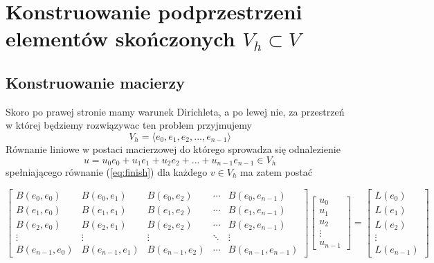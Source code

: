 \documentclass[12pt]{article}
\begin{document}
\section{Konstruowanie podprzestrzeni elementów skończonych $V_h \subset V$}
\subsection{Konstruowanie macierzy}
Skoro po prawej stronie mamy warunek Dirichleta, a po lewej nie, za przestrzeń w której będziemy rozwiązywac ten problem przyjmujemy
\begin{equation}
    V_h = \langle e_0, e_1, e_2, ..., e_{n-1}\rangle
\end{equation}
% 
Równanie liniowe w postaci macierzowej do którego sprowadza się odnalezienie
\begin{equation}
    u = u_0e_0 + u_1e_1 + u_2e_2 + ... + u_{n-1}e_{n-1} \in V_h
\end{equation}
% 
spełniającego równanie (\ref{eq:finish}) dla każdego $v \in V_h$ ma zatem postać

\begin{equation}
    \begin{bmatrix}
        B(e_0,e_0) & B(e_0,e_1) & B(e_0,e_2) & \cdots & B(e_0,e_{n-1}) \\
        B(e_1,e_0) & B(e_1,e_1) & B(e_1,e_2) & \cdots & B(e_1,e_{n-1}) \\
        B(e_2,e_0) & B(e_2,e_1) & B(e_2,e_2) & \cdots & B(e_2,e_{n-1}) \\
        \vdots & \vdots & \vdots & \ddots & \vdots \\
        B(e_{n-1},e_0) & B(e_{n-1},e_1) & B(e_{n-1},e_2) & \cdots & B(e_{n-1},e_{n-1}) 
    \end{bmatrix}  
    \begin{bmatrix}
        u_0 \\
        u_1 \\
        u_2 \\
        \vdots \\
        u_{n-1}
    \end{bmatrix} 
    =
    \begin{bmatrix}
        L(e_0) \\
        L(e_1) \\
        L(e_2) \\
        \vdots \\
        L(e_{n-1})
    \end{bmatrix}
\end{equation}
\end{document}
